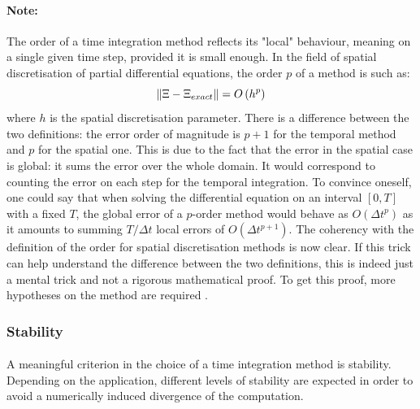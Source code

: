         \paragraph{Note:}
        The order of a time integration method reflects its "local" behaviour, meaning on a single given time step, provided it is small enough.
        In the field of spatial discretisation of partial differential equations, the order $p$ of a method is such as:
        \begin{equation}
          \norm{\Xi - \Xi_{exact}} = O\left(h^p\right)
        \end{equation}
        where $h$ is the spatial discretisation parameter.
        There is a difference between the two definitions: the error order of magnitude is $p+1$ for the temporal method and $p$ for the spatial one.
        This is due to the fact that the error in the spatial case is global: it sums the error over the whole domain.
        It would correspond to counting the error on each step for the temporal integration.
        To convince oneself, one could say that when solving the differential equation on an interval $\left[0, T\right]$ with a fixed $T$, the global error of a $p$-order method would behave as $O\left(\Delta t^p\right)$ as it amounts to summing $T/\Delta t$ local errors of $O\left(\Delta t^{p+1}\right)$.
        The coherency with the definition of the order for spatial discretisation methods is now clear.
        If this trick can help understand the difference between the two definitions, this is indeed just a mental trick and not a rigorous mathematical proof.
        To get this proof, more hypotheses on the method are required \cite{Iserles2008}.


      \subsubsection{Stability}

        \paragraph{}
        A meaningful criterion in the choice of a time integration method is stability.
        Depending on the application, different levels of stability are expected in order to avoid a numerically induced divergence of the computation.

